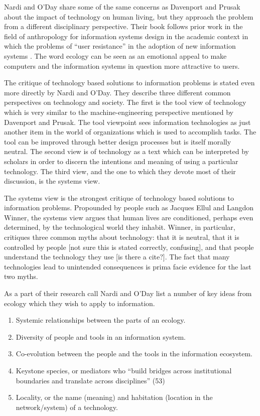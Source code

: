 Nardi and O'Day share some of the same concerns as Davenport and Prusak about the impact of technology on human living, but they approach the problem from a different disciplinary perspective. Their book follows prior work in the field of anthropology for information systems design in the academic context in which the problems of ``user resistance'' in the adoption of new information systems \citep{star_1996}. The word ecology can be seen as an emotional appeal to make computers and the information systems in question more attractive to users.

The critique of technology based solutions to information problems is stated even more directly by Nardi and O'Day. They describe three different common perspectives on technology and society. The first is the tool view of technology which is very similar to the machine-engineering perspective mentioned by Davenport and Prusak. The tool viewpoint sees information technologies as just another item in the world of organizations which is used to accomplish tasks. The tool can be improved through better design processes but is itself morally neutral. The second view is of technology as a text which can be interpreted by scholars in order to discern the intentions and meaning of using a particular technology. The third view, and the one to which they devote most of their discussion, is the systems view.

The systems view is the strongest critique of technology based solutions to information problems. Propounded by people such as Jacques Ellul and Langdon Winner, the systems view argues that human lives are conditioned, perhaps even determined, by the technological world they inhabit. Winner, in particular, critiques three common myths about technology: that it is neutral, that it is controlled by people [not sure this is stated correctly, confusing], and that people understand the technology they use [is there a cite?]. The fact that many technologies lead to unintended consequences is prima facie evidence for the last two myths.

As a part of their research call Nardi and O'Day list a number of key ideas from ecology which they wish to apply to information.

\begin{enumerate}
\item Systemic relationships between the parts of an ecology.
\item Diversity of people and tools in an information system.
\item Co-evolution between the people and the tools in the information ecosystem.
\item Keystone species, or mediators who ``build bridges across institutional boundaries and translate across disciplines'' (53)
\item Locality, or the name (meaning) and habitation (location in the network/system) of a technology.
\end{enumerate}

